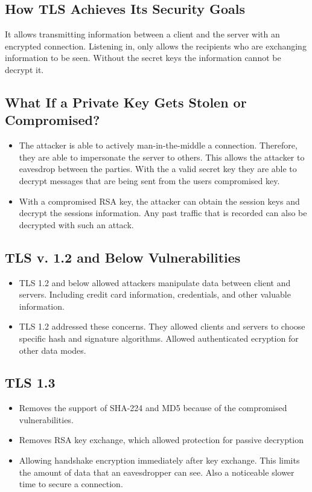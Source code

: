 \documentclass[11pt]{article} %
\begin{document}
{\subsection{How TLS Achieves Its Security Goals}
It allows transmitting information between a client and the server with an encrypted connection. Listening in, only allows the recipients who are exchanging information to be seen. Without the secret keys the information cannot be decrypt it.
\subsection{What If a Private Key Gets Stolen or Compromised?}
\begin{itemize}
  \item The attacker is able to actively man-in-the-middle a connection. Therefore, they are able to impersonate the server to others. This allows the attacker to eavesdrop between the parties. With the a valid secret key they are able to decrypt messages that are being sent from the users compromised key.
  \item With a compromised RSA key, the attacker can obtain the session keys and decrypt the sessions information. Any past traffic that is recorded can also be decrypted with such an attack.
\end{itemize}
\subsection{TLS v. 1.2 and Below Vulnerabilities}
\begin{itemize}
  \item TLS 1.2 and below allowed attackers manipulate data between client and servers. Including credit card information, credentials, and other valuable information. 
  \item TLS 1.2 addressed these concerns. They allowed clients and servers to choose specific hash and signature algorithms. Allowed authenticated ecryption for other data modes.
  \end{itemize}

\subsection{TLS 1.3}
\begin{itemize}
  \item Removes the support of SHA-224 and MD5 because of the compromised vulnerabilities. 
  \item Removes RSA key exchange, which allowed protection for passive decryption
  \item Allowing handshake encryption immediately after key exchange. This limits the amount of data that an eavesdropper can see. Also a noticeable slower time to secure a connection.
\end{itemize}

}
\end{document}
